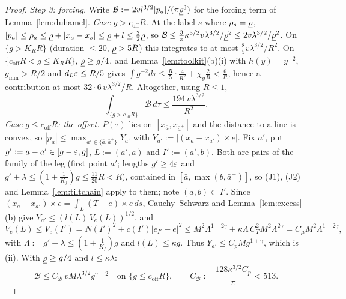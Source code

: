 \begin{proof}
\emph{Step 3: forcing.} Write $\mathcal B:=2vl^{3/2}|p_a|/(\pi\underline{\rho}^3)$ for the forcing term of
Lemma~\ref{lem:duhamel}.
\emph{Case $g>c_{\mathrm{off}}R$.} At the label $s$ where $\rho_s=\underline{\rho}$, $|p_a|\le\rho_a\le\underline{\rho}+|x_a-x_s|\le\underline{\rho}+l\le\frac32\underline{\rho}$,
so $\mathcal B\le\frac3\pi\kappa^{3/2}v\lambda^{3/2}/\underline{\rho}^2\le2v\lambda^{3/2}/\underline{\rho}^2$. On $\{g>K_RR\}$
(duration $\le20$, $\underline{\rho}>5R$) this integrates to at most $\frac85v\lambda^{3/2}/R^2$. On $\{c_{\mathrm{off}}R<g\le K_RR\}$,
$\underline{\rho}\ge g/4$, and Lemma~\ref{lem:toolkit}(b)(i) with $h(y)=y^{-2}$, $g_{\min}>R/2$ and $d_L\varepsilon\le R/5$ gives
$\int g^{-2}d\tau\le\frac R5\cdot\frac4{R^2}+\chi_g\frac2R<\frac6R$, hence a contribution at most
$32\cdot6\,v\lambda^{3/2}/R$. Altogether, using $R\le1$,
\begin{equation}\label{eq:forcefar}
\int_{\{g>c_{\mathrm{off}}R\}}\mathcal B\,d\tau\le\frac{194\,v\lambda^{3/2}}{R^2}.
\end{equation}
\emph{Case $g\le c_{\mathrm{off}}R$: the offset.} $P(\tau)$ lies on $[x_{\bar a},x_{\bar a^+}]$ and the distance to a line is convex,
so $|p_a|\le\max_{a'\in\{\bar a,\bar a^+\}}Y_{a'}$ with $Y_{a'}:=|(x_a-x_{a'})\times e|$. Fix $a'$, put $g':=a-a'\in[g-\varepsilon,g]$,
$L:=(a',a)$ and $I':=(a',b)$. Both are pairs of the family of the leg (first point $a'$; lengths $g'\ge4\varepsilon$ and
$g'+\lambda\le(1+\frac1{K_f})g\le\frac{11}{20}R<R$), contained in $[\bar a,\max(b,\bar a^+)]$, so (J1), (J2) and
Lemma~\ref{lem:tiltchain} apply to them; note $(a,b)\subset I'$. Since $(x_a-x_{a'})\times e=\int_L(T-e)\times e\,ds$,
Cauchy--Schwarz and Lemma~\ref{lem:excess}(b) give
$Y_{a'}\le(l(L)\,V_e(L))^{1/2}$, and
\[
V_e(L)\le V_e(I')=N(I')^2+c(I')|e_{I'}-e|^2
\le M^2\Lambda^{1+2\gamma}+\kappa\Lambda\,C_T^2M^2\Lambda^{2\gamma}=C_\mu M^2\Lambda^{1+2\gamma},
\]
with $\Lambda:=g'+\lambda\le(1+\frac1{K_f})g$ and $l(L)\le\kappa g$. Thus $Y_{a'}\le C_pMg^{1+\gamma}$, which is (ii).
With $\underline{\rho}\ge g/4$ and $l\le\kappa\lambda$:
\begin{equation}\label{eq:forcenear}
\mathcal B\le C_{\mathcal B}\,vM\lambda^{3/2}g^{\gamma-2}\quad\text{on }\{g\le c_{\mathrm{off}}R\},\qquad C_{\mathcal B}:=\frac{128\kappa^{3/2}C_p}{\pi}<513.
\end{equation}


\end{proof}
